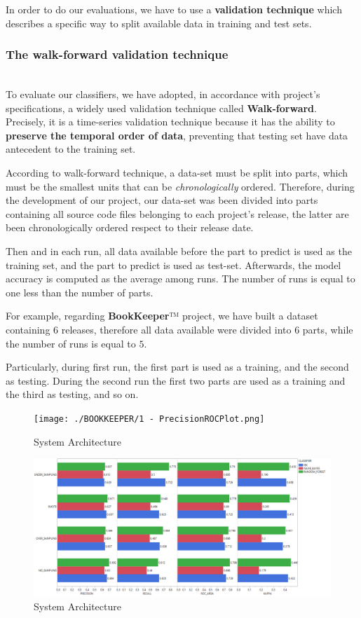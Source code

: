 \documentclass[sigconf]{acmart}
\begin{document}
In order to do our evaluations, we have to use a \textbf{validation technique} which describes a specific way to split available data in training and test sets. 

\subsubsection{The walk-forward validation technique}
\hfill\\

To evaluate our classifiers, we have adopted, in accordance with project's specifications, a widely used validation technique called \textbf{Walk-forward}. Precisely, it is a time-series validation technique because it has the ability to \textbf{preserve the temporal order of data}, preventing that testing set have data antecedent to the training set.

According to walk-forward technique, a data-set must be split into parts, which must be the smallest units that can be \textit{chronologically} ordered. Therefore, during the development of our project, our data-set was been divided into parts containing all source code files belonging to each project's release, the latter are been chronologically ordered respect to their release date.

Then and in each run, all data available before the part to predict is used as the training set, and the part to predict is used as test-set. Afterwards, the model accuracy is computed as the average among runs. The number of runs is equal to one less than the number of parts.

For example, regarding \textbf{BookKeeper}™ project, we have built a dataset containing $6$ releases, therefore all data available were divided into $6$ parts, while the number of runs is equal to $5$.

Particularly, during first run, the first part is used as a training, and the second as testing. During the second run the first two parts are used as a training and the third as testing, and so on. 
 

\begin{figure}[h]
  \centering
  \texttt{[image: ./BOOKKEEPER/1 - PrecisionROCPlot.png]}
  \caption{System Architecture}
  \label{fig:BOOKKEEPER:SamplingNoFeatureSelection}
\end{figure}


 



\begin{figure}[h]
  \centering
  \includegraphics[width=\linewidth]{1 - BOOKKEEPER - SamplingNoFeatureSelection}
  \caption{System Architecture}
  \label{fig:BOOKKEEPER:SamplingNoFeatureSelection}
\end{figure}









\end{document}
